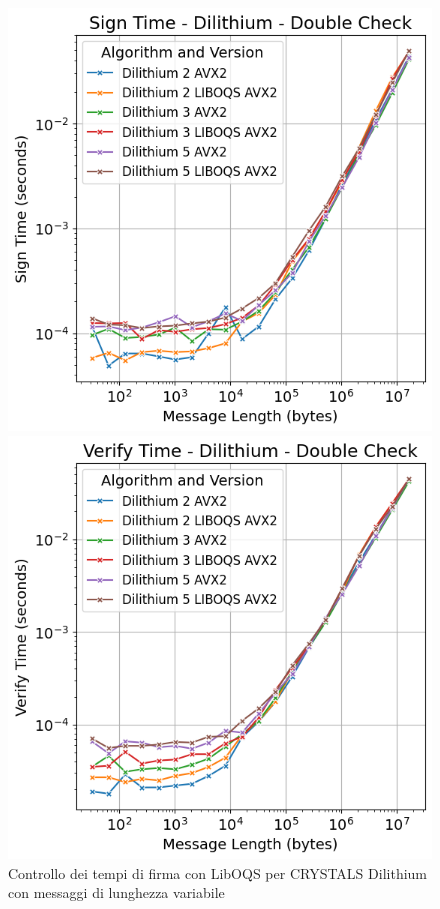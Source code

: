 \begin{figure}[H]
    \centering
    \begin{minipage}{0.45\textwidth}
        \centering
        \includegraphics[width=1\textwidth]{Immagini/20240822_i9/Time_Sign/double_check/TM_SG_dilithium.png}
        \caption{Controllo dei tempi di firma con LibOQS per CRYSTALS Dilithium con messaggi di lunghezza variabile}
        \label{fig:TM_SG_dilithium}
    \end{minipage}\hfill
    \begin{minipage}{0.45\textwidth}
        \centering
        \includegraphics[width=1\textwidth]{Immagini/20240822_i9/Time_Verify/double_check/TM_VF_dilithium.png}

\end{minipage}
\end{figure}

